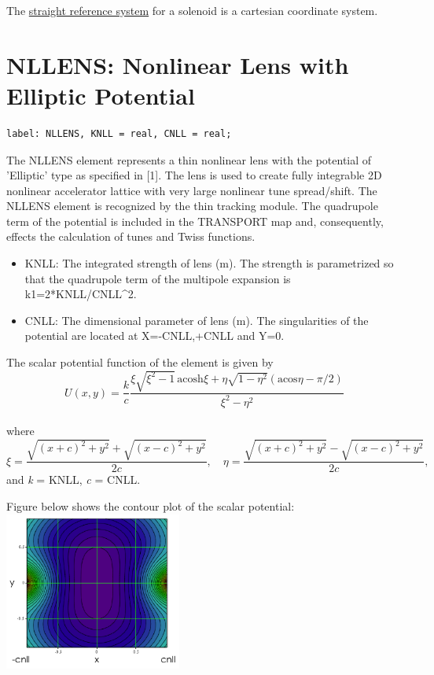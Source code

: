 The \href{local_system.html#straight}{straight reference system} for a
solenoid is a cartesian coordinate system. 
 


%
\section{NLLENS: Nonlinear Lens with Elliptic Potential}

\begin{verbatim}
label: NLLENS, KNLL = real, CNLL = real;
\end{verbatim}

The NLLENS element represents a thin nonlinear lens with the potential
of 'Elliptic' type as specified in [1]. The lens is used to create fully
integrable 2D nonlinear accelerator lattice with very large nonlinear
tune spread/shift. The NLLENS element is recognized by the thin tracking
module. The quadrupole term of the potential is included in the
TRANSPORT map and, consequently, effects the calculation of tunes and
Twiss functions.   

\begin{itemize}
   \item KNLL: The integrated strength of lens (m). The strength is
     parametrized so that     the quadrupole term of the multipole
     expansion is k1=2*KNLL/CNLL\textasciicircum2.      
   \item CNLL: The dimensional parameter of lens (m). The singularities
     of the potential are     located at X=-CNLL,+CNLL and Y=0.  
\end{itemize}

The scalar potential function of the element is given by
\\
\[
U(x,y)=\frac{k}{c}\frac{\xi\sqrt{\xi^2-1} \, \text{acosh}\xi +  
  \eta\sqrt{1-\eta^2}(\text{acos}\eta-\pi/2)}{\xi^2-\eta^2}
\]
\\ where 
\[
\xi = \frac{\sqrt{(x+c)^2+y^2}+\sqrt{(x-c)^2+y^2}}{2c}, 
\quad \eta = \frac{\sqrt{(x+c)^2+y^2}-\sqrt{(x-c)^2+y^2}}{2c},
\]
and \textit{k} = KNLL, \textit{c} = CNLL.

Figure below shows the contour plot of the scalar potential: \\
\includegraphics[width=220px]{Introduction/nllens_potential-2D.png}

